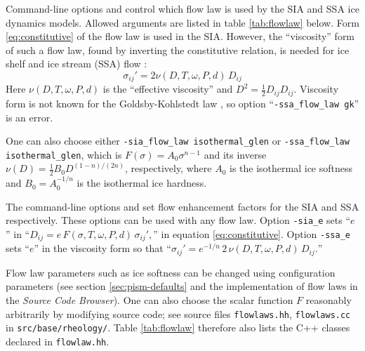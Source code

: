 Command-line options  and  control which flow law is used by the SIA and SSA ice dynamics models.  Allowed arguments are listed in table \ref{tab:flowlaw} below.  Form \eqref{eq:constitutive} of the flow law is used in the SIA.  However, the ``viscosity'' form of such a flow law, found by inverting the constitutive relation, is needed for ice shelf and ice stream (SSA) flow \cite{BBssasliding}:
	$$\sigma_{ij}' = 2 \nu(D,T,\omega,P,d)\,D_{ij} $$
Here $\nu(D,T,\omega,P,d)$ is the ``effective viscosity'' and $D^2 = \frac{1}{2} D_{ij} D_{ij}$.  Viscosity form is not known for the Goldsby-Kohlstedt law \cite{GoldsbyKohlstedt}, so option ``\texttt{-ssa_flow_law gk}'' is an error.

One can also choose either \texttt{-sia_flow_law isothermal_glen} or \texttt{-ssa_flow_law isothermal_glen}, which is $F(\sigma) = A_0 \sigma^{n-1}$ and its inverse $\nu(D) = \frac{1}{2} B_0 D^{(1-n)/(2n)}$, respectively, where $A_0$ is the isothermal ice softness and $B_0=A_0^{-1/n}$ is the isothermal ice hardness.

The command-line options  and  set flow enhancement factors for the SIA and SSA respectively. These options can be used with any flow law.  Option \texttt{-sia_e} sets ``$e$'' in ``$D_{ij} = e\, F(\sigma,T,\omega,P,d)\, \sigma_{ij}',$'' in equation \eqref{eq:constitutive}.  Option \texttt{-ssa_e} sets ``$e$'' in the viscosity form so that ``$\sigma_{ij}'  = e^{-1/n}\, 2\, \nu(D,T,\omega,P,d)\, D_{ij}.$''

Flow law parameters such as ice softness can be changed using configuration parameters (see section \ref{sec:pism-defaults} and the implementation of flow laws in the \emph{Source Code Browser}).  One can also choose the scalar function $F$ reasonably arbitrarily by modifying source code; see source files \texttt{flowlaws.hh}, \texttt{flowlaws.cc} in \texttt{src/base/rheology/}.  Table \ref{tab:flowlaw} therefore also lists the C++ classes declared in \texttt{flowlaw.hh}.

